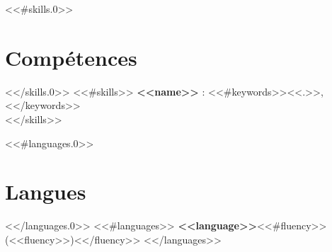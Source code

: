 \documentclass[11pt,a4paper]{article}
\begin{document}
<<#skills.0>>\section*{Compétences}<</skills.0>>
<<#skills>>
\noindent\textbf{<<name>>} : <<#keywords>><<.>>, <</keywords>>\\[2pt]
<</skills>>

<<#languages.0>>\section*{Langues}<</languages.0>>
<<#languages>>
\textbf{<<language>>}<<#fluency>> (<<fluency>>)<</fluency>>\quad
<</languages>>
\end{document}

